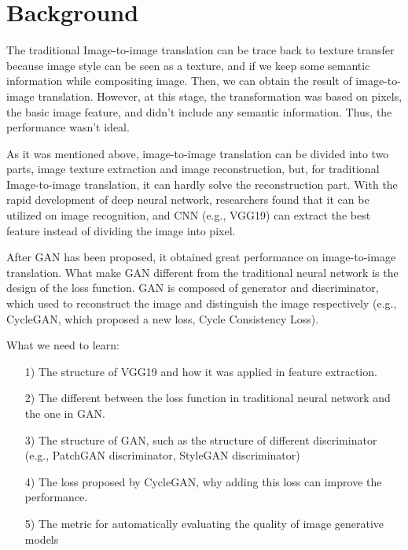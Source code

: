 \section{Background}
The traditional Image-to-image translation can be trace back to texture transfer because image style can be seen as a texture, and if we keep some semantic information while compositing image. Then, we can obtain the result of image-to-image translation. However, at this stage, the transformation was based on pixels, the basic image feature, and didn’t include any semantic information. Thus, the performance wasn’t ideal. 

As it was mentioned above, image-to-image translation can be divided into two parts, image texture extraction and image reconstruction, but, for traditional Image-to-image translation, it can hardly solve the reconstruction part. With the rapid development of deep neural network, researchers found that it can be utilized on image recognition, and CNN (e.g., VGG19) can extract the best feature instead of dividing the image into pixel. 

After GAN has been proposed, it obtained great performance on image-to-image translation. What make GAN different from the traditional neural network is the design of the loss function. GAN is composed of generator and discriminator, which used to reconstruct the image and distinguish the image respectively (e.g., CycleGAN, which proposed a new loss, Cycle Consistency Loss). 

What we need to learn:
\begin{itemize}
  \item [1)] 
The structure of VGG19 and how it was applied in feature extraction.
  \item [2)] 
The different between the loss function in traditional neural network and the one in GAN.
  \item [3)] 
The structure of GAN, such as the structure of different discriminator (e.g., PatchGAN discriminator, StyleGAN discriminator)
  \item [4)] 
The loss proposed by CycleGAN, why adding this loss can improve the performance.
  \item [5)]
The metric for automatically evaluating the quality of image generative models 
\end{itemize}


